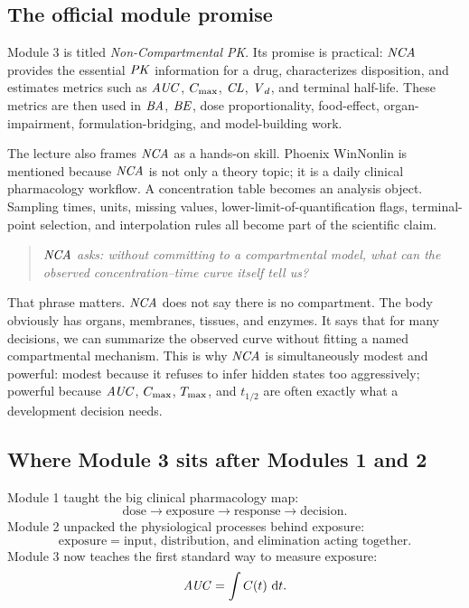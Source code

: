 \documentclass[a4paper]{article}
\newcommand{\CL}{\ensuremath{\pksym{CL}}}
\newcommand{\Vd}{\ensuremath{\pksym{V}_d}}
\newcommand{\AUC}{\ensuremath{\pksym{AUC}}}
\newcommand{\Cmax}{\ensuremath{C_{\pklab{max}}}}
\newcommand{\Tmax}{\ensuremath{T_{\pklab{max}}}}
\newcommand{\halfLife}{\ensuremath{t_{1/2}}}
\newcommand{\PK}{\ensuremath{\pksym{PK}}}
\newcommand{\NCA}{\ensuremath{\pksym{NCA}}}
\newcommand{\BA}{\ensuremath{\pksym{BA}}}
\newcommand{\BE}{\ensuremath{\pksym{BE}}}
\begin{document}
\subsection{The official module promise}

Module 3 is titled \emph{Non-Compartmental PK}. Its promise is practical: \NCA{} provides the essential \PK{} information for a drug, characterizes disposition, and estimates metrics such as \AUC{}, \Cmax{}, \CL{}, \Vd{}, and terminal half-life. These metrics are then used in \BA{}, \BE{}, dose proportionality, food-effect, organ-impairment, formulation-bridging, and model-building work.

The lecture also frames \NCA{} as a hands-on skill. Phoenix WinNonlin is mentioned because \NCA{} is not only a theory topic; it is a daily clinical pharmacology workflow. A concentration table becomes an analysis object. Sampling times, units, missing values, lower-limit-of-quantification flags, terminal-point selection, and interpolation rules all become part of the scientific claim.

\begin{quote}
\itshape
\NCA{} asks: without committing to a compartmental model, what can the observed concentration--time curve itself tell us?
\end{quote}

That phrase matters. \NCA{} does not say there is no compartment. The body obviously has organs, membranes, tissues, and enzymes. It says that for many decisions, we can summarize the observed curve without fitting a named compartmental mechanism. This is why \NCA{} is simultaneously modest and powerful: modest because it refuses to infer hidden states too aggressively; powerful because \AUC{}, \Cmax{}, \Tmax{}, and \halfLife{} are often exactly what a development decision needs.

\subsection{Where Module 3 sits after Modules 1 and 2}

Module 1 taught the big clinical pharmacology map:
\[
  \text{dose}\longrightarrow \text{exposure}\longrightarrow \text{response}\longrightarrow \text{decision}.
\]
Module 2 unpacked the physiological processes behind exposure:
\[
  \text{exposure} = \text{input, distribution, and elimination acting together}.
\]
Module 3 now teaches the first standard way to measure exposure:
\[
  \AUC = \int C(t)\,\dd t.
\]
\end{document}

